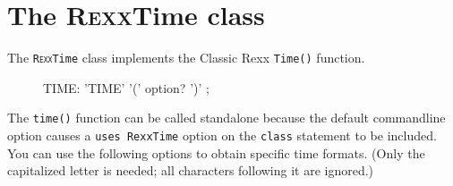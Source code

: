 \section{The R\textsc{exx}Time class}\label{refrexxtime}
 
The \texttt{R\textsc{exx}Time} class implements the Classic Rexx \texttt{Time()} function.
\begin{figure}[h]
   \begin{shaded}
\begin{rail}
  TIME:  'TIME' '('   option?  ')'
  ;
\end{rail}
 \end{shaded}
\end{figure}

The \texttt{time()} function can be called standalone because the
default   commandline option causes a \texttt{uses
  RexxTime} option on the \texttt{class} statement to be included. You can use the following options to obtain specific time formats. (Only the capitalized letter is needed; all characters following it are ignored.)
